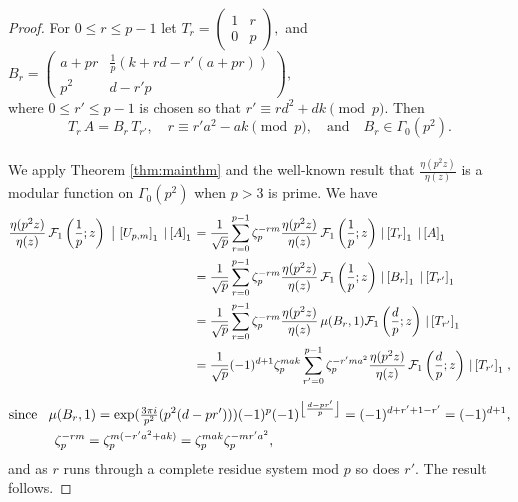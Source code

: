 \documentclass[12pt]{amsart}
\theoremstyle{definition}
\theoremstyle{remark}
\numberwithin{equation}{section}
\newcommand\Fell[4]{\mathcal{F}_{#1}\left(\frac{#2}{#3};#4\right)}
\newcommand\FL[1]{\left\lfloor#1\right\rfloor}
\newcommand\strokeb[2]{\,\left\arrowvert\,\left[#1\right]_#2\right.}
\newcommand\thm[1]{\ref{thm:#1}}
\begin{document}
\begin{proof}
For $0 \le r \le p-1$ let
$T_r = \begin{pmatrix}1 & r \\ 0 & p \end{pmatrix},$
and
$B_r = 
\begin{pmatrix}
a + pr  & \frac{1}{p}( k + rd - r'(a+pr)) \\
p^2 & d - r' p 
\end{pmatrix},$\\
where $0 \le r'\le p-1$ is chosen so that
$r' \equiv r d^2 + dk \pmod{p}.$
Then\\
$$T_r \, A = B_r \, T_{r'},\quad 
r \equiv r' a^2 - ak \pmod{p},\quad\mbox{and}\quad
B_r \in \Gamma_0(p^2).$$\\
We apply Theorem \thm{mainthm} and the well-known result that $\frac{\eta(p^2z)}{\eta(z)}$ is a modular function on $\Gamma_0(p^2)$ when
$p>3$ is prime. We have 
\begin{align*}
\frac{\eta(p^2 z)}{\eta(z)} \, \Fell{1}{1}{p}{z}
  \strokeb{U_{p,m}}{1} \strokeb{A}{1} & = \frac{1}{\sqrt{p}} \sum_{r=0}^{p-1}
  \zeta_p^{-rm} 
  \frac{\eta(p^2 z)}{\eta(z)} \, \Fell{1}{1}{p}{z}
   \strokeb{T_r}{1} \strokeb{A}{1} 
\\
& = \frac{1}{\sqrt{p}} \sum_{r=0}^{p-1}
  \zeta_p^{-rm} 
  \frac{\eta(p^2 z)}{\eta(z)} \, \Fell{1}{1}{p}{z}
   \strokeb{B_r}{1} \strokeb{T_{r'}}{1} 
\\
& = \frac{1}{\sqrt{p}} \sum_{r=0}^{p-1}
  \zeta_p^{-rm} 
  \frac{\eta(p^2 z)}{\eta(z)} \, 
   \mu(B_r,1) 
   \Fell{1}{d}{p}{z}
   \strokeb{T_{r'}}{1} 
\\
& = \frac{1}{\sqrt{p}} (-1)^{d+1} \zeta_p^{mak} \sum_{r'=0}^{p-1}
  \zeta_p^{-r'ma^2} 
  \frac{\eta(p^2 z)}{\eta(z)} \, 
   \Fell{1}{d}{p}{z}
   \strokeb{T_{r'}}{1},
\end{align*}
 
\begin{align*}
&\text{since}\hspace{3mm}\mu(B_r,1) = \exp(\tfrac{3\pi i}{p^2} (p^2(d - pr'))) (-1)^{p}(-1)^{\FL{\frac{d - pr'}{p}}}= (-1)^{d + r' + 1 -r'} = (-1)^{d+1},
\\
&\hspace{12mm}\zeta_p^{-rm} = \zeta_p^{m(-r'a^2 +ak)}
= \zeta_p^{mak} \zeta_p^{-mr'a^2},
\end{align*}
and as $r$ runs through a complete residue system mod $p$ so does
$r'$.
The result follows.
\end{proof}
\end{document}

